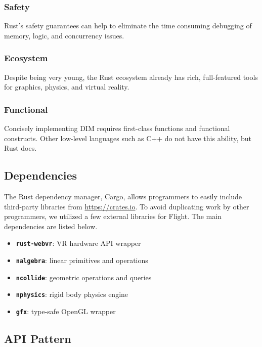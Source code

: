 \documentclass[conference,12pt]{IEEEtran}
\begin{document}
\subsubsection{Safety}

Rust's safety guarantees can help to eliminate the time consuming debugging of
memory, logic, and concurrency issues.

\subsubsection{Ecosystem}

Despite being very young, the Rust ecosystem already has rich, full-featured
tools for graphics, physics, and virtual reality.

\subsubsection{Functional}

Concisely implementing DIM requires first-class functions and functional
constructs. Other low-level languages such as C++ do not have this ability, but
Rust does.

\subsection{Dependencies}

The Rust dependency manager, Cargo, allows programmers to easily include
third-party libraries from \url{https://crates.io}. To avoid duplicating work
by other programmers, we utilized a few external libraries for Flight. The main
dependencies are listed below.
\begin{itemize}
    \item \textbf{\texttt{rust-webvr}}: VR hardware API wrapper
    \item \textbf{\texttt{nalgebra}}: linear primitives and operations
    \item \textbf{\texttt{ncollide}}: geometric operations and queries
    \item \textbf{\texttt{nphysics}}: rigid body physics engine
    \item \textbf{\texttt{gfx}}: type-safe OpenGL wrapper
\end{itemize}

\subsection{API Pattern}
\end{document}
